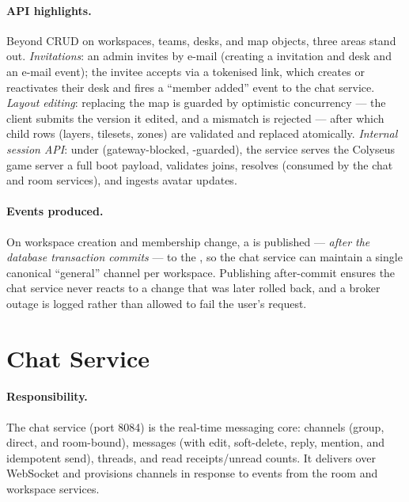 \paragraph{API highlights.} Beyond CRUD on workspaces, teams, desks, and map
objects, three areas stand out. \emph{Invitations}: an admin invites by e-mail
(creating a  invitation and desk and an e-mail event); the invitee
accepts via a tokenised link, which creates or reactivates their desk and fires a
``member added'' event to the chat service. \emph{Layout editing}: replacing the
map is guarded by optimistic concurrency --- the client submits the version it
edited, and a mismatch is rejected --- after which child rows (layers, tilesets,
zones) are validated and replaced atomically. \emph{Internal session API}: under
 (gateway-blocked, -guarded), the
service serves the Colyseus game server a full  boot
payload, validates joins, resolves  (consumed by
the chat and room services), and ingests avatar  updates.

\paragraph{Events produced.} On workspace creation and membership change, a
 is published --- \emph{after the database
transaction commits} --- to the , so the chat service can
maintain a single canonical ``general'' channel per workspace. Publishing
after-commit ensures the chat service never reacts to a change that was later
rolled back, and a broker outage is logged rather than allowed to fail the
user's request.

\section{Chat Service}
\label{sec:be-chat}

\paragraph{Responsibility.} The chat service (port 8084) is the real-time
messaging core: channels (group, direct, and room-bound), messages (with edit,
soft-delete, reply, mention, and idempotent send), threads, and read
receipts/unread counts. It delivers over WebSocket and provisions channels in
response to events from the room and workspace services.

